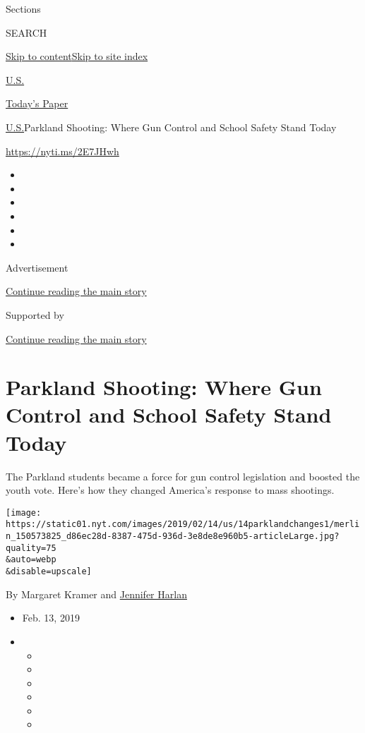 Sections

SEARCH

\protect\hyperlink{site-content}{Skip to
content}\protect\hyperlink{site-index}{Skip to site index}

\href{https://www.nytimes.com/section/us}{U.S.}

\href{https://myaccount.nytimes.com/auth/login?response_type=cookie\&client_id=vi}{}

\href{https://www.nytimes.com/section/todayspaper}{Today's Paper}

\href{/section/us}{U.S.}\textbar{}Parkland Shooting: Where Gun Control
and School Safety Stand Today

\href{https://nyti.ms/2E7JHwh}{https://nyti.ms/2E7JHwh}

\begin{itemize}
\item
\item
\item
\item
\item
\item
\end{itemize}

Advertisement

\protect\hyperlink{after-top}{Continue reading the main story}

Supported by

\protect\hyperlink{after-sponsor}{Continue reading the main story}

\hypertarget{parkland-shooting-where-gun-control-and-school-safety-stand-today}{%
\section{Parkland Shooting: Where Gun Control and School Safety Stand
Today}\label{parkland-shooting-where-gun-control-and-school-safety-stand-today}}

The Parkland students became a force for gun control legislation and
boosted the youth vote. Here's how they changed America's response to
mass shootings.

\texttt{[image: https://static01.nyt.com/images/2019/02/14/us/14parklandchanges1/merlin\_150573825\_d86ec28d-8387-475d-936d-3e8de8e960b5-articleLarge.jpg?quality=75\\\&auto=webp\\\&disable=upscale]}

By Margaret Kramer and
\href{https://www.nytimes.com/by/jennifer-harlan}{Jennifer Harlan}

\begin{itemize}
\item
  Feb. 13, 2019
\item
  \begin{itemize}
  \item
  \item
  \item
  \item
  \item
  \item
  \end{itemize}
\end{itemize}

